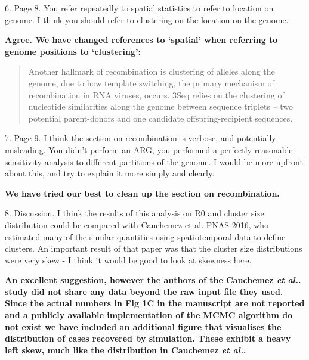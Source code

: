 \documentclass[11pt,oneside,letterpaper]{article}
\begin{document}
6. Page 8. You refer repeatedly to spatial statistics to refer to location on genome. I think you should refer to clustering on the location on the genome.

\textbf{Agree. We have changed references to `spatial' when referring to genome positions to `clustering':}

\begin{quotation}
Another hallmark of recombination is clustering of alleles along the genome, due to how template switching, the primary mechanism of recombination in RNA viruses, occurs.
3Seq relies on the clustering of nucleotide similarities along the genome between sequence triplets -- two potential parent-donors and one candidate offspring-recipient sequences.
\end{quotation}

7. Page 9. I think the section on recombination is verbose, and potentially misleading. You didn't perform an ARG, you performed a perfectly reasonable sensitivity analysis to different partitions of the genome. I would be more upfront about this, and try to explain it more simply and clearly.

\textbf{We have tried our best to clean up the section on recombination.}

8. Discussion. I think the results of this analysis on R0 and cluster size distribution could be compared with Cauchemez et al. PNAS 2016, who estimated many of the similar quantities using spatiotemporal data to define clusters. An important result of that paper was that the cluster size distributions were very skew - I think it would be good to look at skewness here.

\textbf{An excellent suggestion, however the authors of the Cauchemez \textit{et al.}. study did not share any data beyond the raw input file they used. Since the actual numbers in Fig 1C in the manuscript are not reported and a publicly available implementation of the MCMC algorithm do not exist we have included an additional figure that visualises the distribution of cases recovered by simulation. These exhibit a heavy left skew, much like the distribution in Cauchemez \textit{et al.}.}

% 
\end{document}
